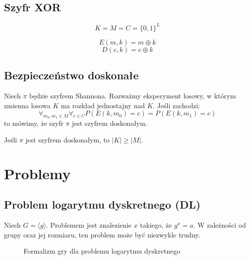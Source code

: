 \documentclass{../notatki}
\begin{document}
\subsection{Szyfr XOR}

$$
K = M = C = \{0, 1\}^L
$$

$$
E(m, k) = m \oplus k
$$
$$
D(c, k) = c \oplus k
$$

\subsection{Bezpieczeństwo doskonałe}

Niech $\pi$ będzie szyfrem Shannona. Rozważmy eksperyment losowy, w którym
zmienna losowa $K$ ma rozkład jednostajny nad $K$. Jeśli zachodzi:
$$
\forall_{m_0, m_1 \in M} \forall_{c \in C} P(E(k, m_0) = c) = P(E(k, m_1) = c)
$$
to mówimy, że szyfr $\pi$ jest szyfrem doskonałym.

Jeśli $\pi$ jest szyfrem doskonałym, to $|K| \ge |M|$.

\section{Problemy}

\subsection{Problem logarytmu dyskretnego (DL)}

Niech $G = \langle g \rangle$. Problemem jest znalezienie $x$
takiego, że $g^x = a$. W zależności od grupy oraz jej rozmiaru,
ten problem może być niezwykle trudny.

\begin{figure}[H]
  \centering
  \caption{Formalizm gry dla problemu logarytmu dyskretnego}
\end{figure}
\end{document}
